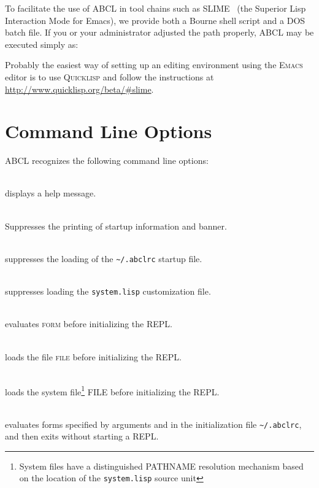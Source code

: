\documentclass[10pt]{book}
\begin{document}
To facilitate the use of ABCL in tool chains such as SLIME~\cite{slime}
(the Superior Lisp Interaction Mode for Emacs), we provide both a Bourne
shell script and a \textsc{DOS} batch file.  If you or your
administrator adjusted the path properly, ABCL may be executed simply
as:


Probably the easiest way of setting up an editing environment using the
\textsc{Emacs} editor is to use \textsc{Quicklisp} and follow the instructions at
\url{http://www.quicklisp.org/beta/#slime}.

\section{Command Line Options}

ABCL recognizes the following command line options:


\begin{description}
\item {} \\
  displays a help message.
\item {} \\
  Suppresses the printing of startup information and banner.
\item {} \\
  suppresses the loading of the \verb+~/.abclrc+ startup file.
\item {} \\
  suppresses loading the \texttt{system.lisp} customization file. 
\item {} \\
  evaluates \textsc{form} before initializing the REPL.
\item {} \\
  loads the file \textsc{file} before initializing the REPL.
\item {} \\ loads the system
  file\footnote{System files have a distinguished PATHNAME resolution
  mechanism based on the location of the \texttt{system.lisp} source
  unit} FILE before initializing the REPL.
\item {}  \\evaluates forms specified by arguments and in
  the initialization file \verb+~/.abclrc+, and then exits without
  starting a \textsc{REPL}.
\end{description}
\end{document}
